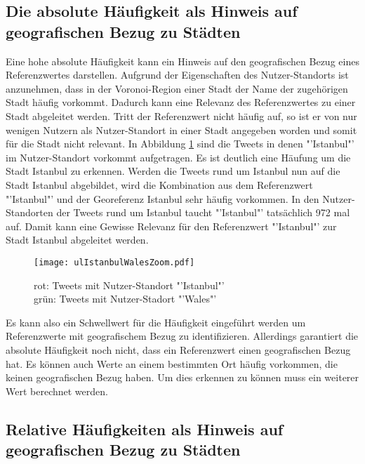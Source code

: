 		\subsection{Die absolute Häufigkeit als Hinweis auf geografischen Bezug zu Städten} 
			
			Eine hohe absolute Häufigkeit kann ein Hinweis auf den geografischen Bezug eines Referenzwertes darstellen. 
			Aufgrund der Eigenschaften des Nutzer-Standorts ist anzunehmen, dass in der Voronoi-Region einer Stadt der Name der zugehörigen Stadt häufig vorkommt.
			Dadurch kann eine Relevanz des Referenzwertes zu einer Stadt abgeleitet werden. 
			Tritt der Referenzwert nicht häufig auf, so ist er von nur wenigen Nutzern als Nutzer-Standort in einer Stadt angegeben worden und somit für die Stadt nicht relevant.
			In Abbildung \ref{img:ulIstanbulWalesZoom} sind die Tweets in denen "'Istanbul"' im Nutzer-Standort vorkommt aufgetragen.
			Es ist deutlich eine Häufung um die Stadt Istanbul zu erkennen. 
			Werden die Tweets rund um Istanbul nun auf die Stadt Istanbul abgebildet, wird die Kombination aus dem Referenzwert "'Istanbul"' und der Georeferenz Istanbul sehr häufig vorkommen.
			In den Nutzer-Standorten der Tweets rund um Istanbul taucht "'Istanbul"' tatsächlich 972 mal auf.
			Damit kann eine Gewisse Relevanz für den Referenzwert "'Istanbul"' zur Stadt Istanbul abgeleitet werden.

			\begin{figure}[h!]
					\begin{center}
						\texttt{[image: ulIstanbulWalesZoom.pdf]}
						\caption{rot: Tweets mit Nutzer-Standort "'Istanbul"'\\ grün: Tweets mit Nutzer-Stadort "'Wales"'}
						\label{img:ulIstanbulWalesZoom}
					\end{center}
			\end{figure}	

			Es kann also ein Schwellwert für die Häufigkeit eingeführt werden um Referenzwerte mit geografischem Bezug zu identifizieren.
			Allerdings garantiert die absolute Häufigkeit noch nicht, dass ein Referenzwert einen geografischen Bezug hat. 
			Es können auch Werte an einem bestimmten Ort häufig vorkommen, die keinen geografischen Bezug haben.
			Um dies erkennen zu können muss ein weiterer Wert berechnet werden.

		\subsection{Relative Häufigkeiten als Hinweis auf geografischen Bezug zu Städten}

